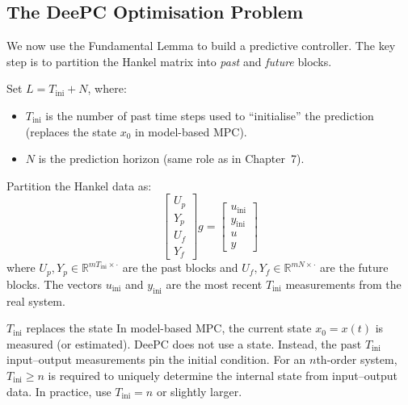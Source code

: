 \subsection{The DeePC Optimisation Problem}
\label{sec:deepc_formulation}

We now use the Fundamental Lemma to build a predictive controller. The key step is to partition the Hankel matrix into \emph{past} and \emph{future} blocks.

Set $L = T_\text{ini} + N$, where:
\begin{itemize}[noitemsep]
	\item $T_\text{ini}$ is the number of past time steps used to ``initialise'' the prediction (replaces the state $x_0$ in model-based MPC).
	\item $N$ is the prediction horizon (same role as in Chapter~7).
\end{itemize}

Partition the Hankel data as:
\begin{equation}\label{eq:deepc_partition}
	\begin{bmatrix} U_p \\ Y_p \\ U_f \\ Y_f \end{bmatrix} g = \begin{bmatrix} u_\text{ini} \\ y_\text{ini} \\ u \\ y \end{bmatrix}
\end{equation}
where $U_p, Y_p \in \mathbb{R}^{mT_\text{ini} \times \cdot}$ are the past blocks and $U_f, Y_f \in \mathbb{R}^{mN \times \cdot}$ are the future blocks. The vectors $u_\text{ini}$ and $y_\text{ini}$ are the most recent $T_\text{ini}$ measurements from the real system.

\begin{alertbox}{$T_\text{ini}$ replaces the state}
	In model-based MPC, the current state $x_0 = x(t)$ is measured (or estimated). DeePC does not use a state. Instead, the past $T_\text{ini}$ input--output measurements pin the initial condition. For an $n$th-order system, $T_\text{ini} \ge n$ is required to uniquely determine the internal state from input--output data. In practice, use $T_\text{ini} = n$ or slightly larger.
\end{alertbox}

